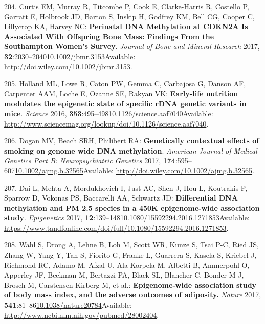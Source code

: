\documentclass[
]{book}
\begin{document}
\leavevmode\hypertarget{ref-Curtis2017}{}%
204. Curtis EM, Murray R, Titcombe P, Cook E, Clarke-Harris R, Costello P, Garratt E, Holbrook JD, Barton S, Inskip H, Godfrey KM, Bell CG, Cooper C, Lillycrop KA, Harvey NC: \textbf{Perinatal DNA Methylation at CDKN2A Is Associated With Offspring Bone Mass: Findings From the Southampton Women's Survey}. \emph{Journal of Bone and Mineral Research} 2017, \textbf{32}:2030--2040\href{https://doi.org/10.1002/jbmr.3153}{10.1002/jbmr.3153}Available: \url{http://doi.wiley.com/10.1002/jbmr.3153}.

\leavevmode\hypertarget{ref-Holland2017}{}%
205. Holland ML, Lowe R, Caton PW, Gemma C, Carbajosa G, Danson AF, Carpenter AAM, Loche E, Ozanne SE, Rakyan VK: \textbf{Early-life nutrition modulates the epigenetic state of specific rDNA genetic variants in mice}. \emph{Science} 2016, \textbf{353}:495--498\href{https://doi.org/10.1126/science.aaf7040}{10.1126/science.aaf7040}Available: \url{http://www.sciencemag.org/lookup/doi/10.1126/science.aaf7040}.

\leavevmode\hypertarget{ref-Dogan2017}{}%
206. Dogan MV, Beach SRH, Philibert RA: \textbf{Genetically contextual effects of smoking on genome wide DNA methylation}. \emph{American Journal of Medical Genetics Part B: Neuropsychiatric Genetics} 2017, \textbf{174}:595--607\href{https://doi.org/10.1002/ajmg.b.32565}{10.1002/ajmg.b.32565}Available: \url{http://doi.wiley.com/10.1002/ajmg.b.32565}.

\leavevmode\hypertarget{ref-Dai2016}{}%
207. Dai L, Mehta A, Mordukhovich I, Just AC, Shen J, Hou L, Koutrakis P, Sparrow D, Vokonas PS, Baccarelli AA, Schwartz JD: \textbf{Differential DNA methylation and PM 2.5 species in a 450K epigenome-wide association study}. \emph{Epigenetics} 2017, \textbf{12}:139--148\href{https://doi.org/10.1080/15592294.2016.1271853}{10.1080/15592294.2016.1271853}Available: \url{https://www.tandfonline.com/doi/full/10.1080/15592294.2016.1271853}.

\leavevmode\hypertarget{ref-Wahl2016}{}%
208. Wahl S, Drong A, Lehne B, Loh M, Scott WR, Kunze S, Tsai P-C, Ried JS, Zhang W, Yang Y, Tan S, Fiorito G, Franke L, Guarrera S, Kasela S, Kriebel J, Richmond RC, Adamo M, Afzal U, Ala-Korpela M, Albetti B, Ammerpohl O, Apperley JF, Beekman M, Bertazzi PA, Black SL, Blancher C, Bonder M-J, Brosch M, Carstensen-Kirberg M, et al.: \textbf{Epigenome-wide association study of body mass index, and the adverse outcomes of adiposity.} \emph{Nature} 2017, \textbf{541}:81--86\href{https://doi.org/10.1038/nature20784}{10.1038/nature20784}Available: \url{http://www.ncbi.nlm.nih.gov/pubmed/28002404}.
\end{document}
